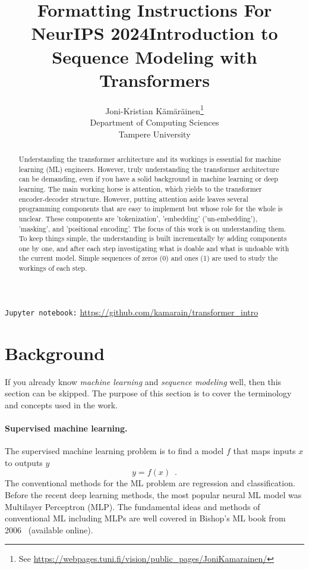 \documentclass[final]{article}
\title{Formatting Instructions For NeurIPS 2024}
\title{Introduction to Sequence Modeling with Transformers}
\author{%
  Joni-Kristian K{\"a}m{\"a}r{\"a}inen\thanks{See \url{https://webpages.tuni.fi/vision/public_pages/JoniKamarainen/}}\\
  Department of Computing Sciences\\
  Tampere University
}
\begin{document}
\maketitle


\begin{abstract}
  Understanding the transformer architecture and its workings is
  essential for machine learning (ML) engineers. However, truly
  understanding the transformer architecture can be demanding, even if
  you have a solid background in machine learning or deep
  learning. The main working horse is attention, which yields to the
  transformer encoder-decoder structure. However, putting attention
  aside leaves several programming components that are easy to
  implement but whose role for the whole is unclear. These components
  are 'tokenization', 'embedding' ('un-embedding'), 'masking', and
  'positional encoding'. The focus of this work is on understanding
  them. To keep things simple, the understanding is built
  incrementally by adding components one by one, and after each step
  investigating what is doable and what is undoable with the current
  model. Simple sequences of zeros (0) and ones (1) are used to study
  the workings of each step.
\end{abstract}

\begin{center}
\texttt{Jupyter notebook:} \url{https://github.com/kamarain/transformer_intro}
\end{center}

\section{Background}
If you already know \textit{machine learning} and
\textit{sequence modeling} well, then this section can be skipped. The
purpose of this section is to 
cover the terminology and concepts used in the work.

\paragraph{Supervised machine learning.}
The supervised machine learning problem is to find a model $f$ that
maps inputs $x$ to outputs $y$
\begin{equation}
  y = f(x) \enspace .
  \label{eq:supervisedML}
\end{equation}
The conventional methods for the ML problem are regression and classification.
Before the recent deep learning methods,
the most popular neural ML model was Multilayer Perceptron (MLP). The
fundamental ideas and methods of conventional ML including MLPs are
well covered in Bishop's ML book from 2006~\cite{MLBook}
(available online).
\end{document}
